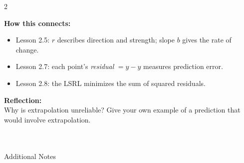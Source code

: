 \documentclass[10pt]{article}
\begin{document}
\vspace{0.1in}

\begin{spiralbox}
\small
\begin{multicols}{2}

\textbf{How this connects:}
\begin{itemize}[itemsep=3pt]
  \item Lesson 2.5: $r$ describes direction and strength; slope $b$ gives the rate of change.
  \item Lesson 2.7: each point's \textit{residual} $= y - \hat{y}$ measures prediction error.
  \item Lesson 2.8: the LSRL minimizes the sum of squared residuals.
\end{itemize}

\columnbreak

\textbf{Reflection:}\\
Why is extrapolation unreliable? Give your own example of a prediction that would involve
extrapolation.\\[2pt]
\writeline\\[1pt]\writeline\\[1pt]\writeline

\end{multicols}
\end{spiralbox}

\vspace{0.1in}

\begin{notesbox}{Additional Notes}
\vspace{0pt}
\writeline\\\writeline\\\writeline\\\writeline\\\writeline\\\writeline
\end{notesbox}
\end{document}
